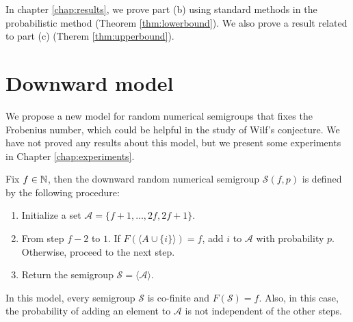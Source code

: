 In chapter \ref{chap:results}, we prove part (b) using standard methods in the probabilistic method (Theorem \ref{thm:lowerbound}). We also prove a result related to part (c) (Therem \ref{thm:upperbound}).

\section{Downward model}\label{sec:contrib1:theme2}

We propose a new model for random numerical semigroups that fixes the Frobenius number, which could be helpful in the study of Wilf's conjecture. We have not proved any results about this model, but we present some experiments in Chapter \ref{chap:experiments}.

\begin{definition} Fix $f \in \mathbb{N}$, then the downward random numerical semigroup $\mathcal{S}(f, p)$ is defined by the following procedure: 
\begin{enumerate}
    \item Initialize a set $\mathcal{A} = \{f + 1, \ldots, 2f, 2f + 1\}$.
    \item From step $f - 2$ to $1$. If $F(\langle A \cup \{i\} \rangle) = f$, add $i$ to $\mathcal{A}$ with probability $p$. Otherwise, proceed to the next step.
    \item Return the semigroup $\mathcal{S} = \langle\mathcal{A}\rangle$.
\end{enumerate}
In this model, every semigroup $\mathcal{S}$ is co-finite and $F(\mathcal{S}) = f$. Also, in this case, the probability of adding an element to $\mathcal{A}$ is not independent of the other steps. 
    
\end{definition}

